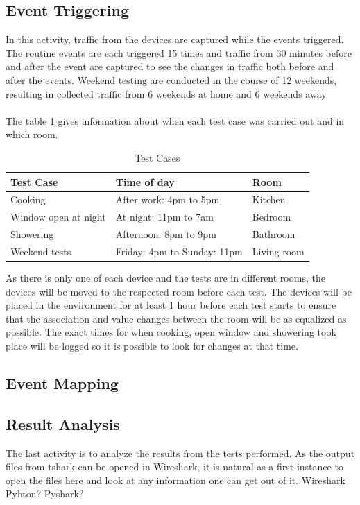 \subsection{Event Triggering}
In this activity, traffic from the devices are captured while the events triggered. The routine events are each triggered 15 times and traffic from 30 minutes before and after the event are captured to see the changes in traffic both before and after the events. Weekend testing are conducted in the course of 12 weekends, resulting in collected traffic from 6 weekends at home and 6 weekends away. 
\\\\
The table \ref{tab:TestCases} gives information about when each test case was carried out and in which room. 
\begin{table}[!hbtp]
    \centering
    \begin{adjustbox}{width=1\textwidth}
    \begin{tabular}{| p{5cm} | p{5cm} | p{3cm} |} 
        \hline
        \textbf{Test Case} & \textbf{Time of day} & \textbf{Room} \\
        \hline
        Cooking & After work: 4pm to 5pm & Kitchen \\
        \hline
        Window open at night & At night: 11pm to 7am & Bedroom\\
        \hline
        Showering & Afternoon: 8pm to 9pm & Bathroom \\
        \hline
        Weekend tests & Friday: 4pm to Sunday: 11pm & Living room \\
        \hline
    \end{tabular}
    \end{adjustbox}
    \caption{Test Cases}
    \label{tab:TestCases}
\end{table}

As there is only one of each device and the tests are in different rooms, the devices will be moved to the respected room before each test. The devices will be placed in the environment for at least 1 hour before each test starts to ensure that the association and value changes between the room will be as equalized as possible. The exact times for when cooking, open window and showering took place will be logged so it is possible to look for changes at that time. 

\subsection{Event Mapping}

\subsection{Result Analysis}
The last activity is to analyze the results from the tests performed. As the output files from tshark can be opened in Wireshark, it is natural as a first instance to open the files here and look at any information one can get out of it. 
Wireshark
Pyhton? Pyshark?
